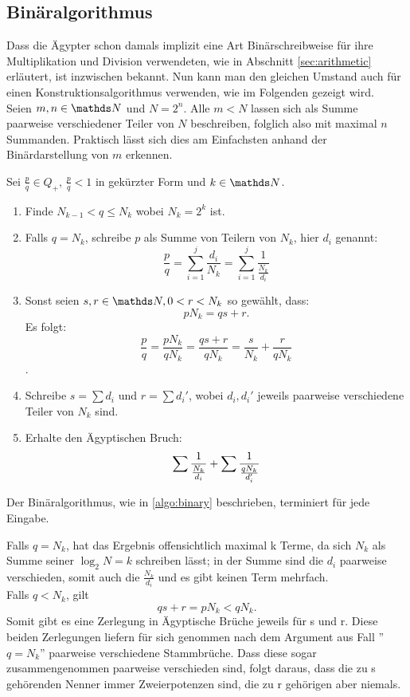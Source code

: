 \subsection{Binäralgorithmus}

Dass die Ägypter schon damals implizit eine Art Binärschreibweise für ihre Multiplikation und Division verwendeten, wie in Abschnitt \ref{sec:arithmetic} erläutert, ist inzwischen bekannt. Nun kann man den gleichen Umstand auch für einen Konstruktionsalgorithmus verwenden, wie im Folgenden gezeigt wird.\\
Seien $m, n \in \N$ und $N = 2^n$. Alle $m < N$ lassen sich als Summe paarweise verschiedener Teiler von $N$ beschreiben, folglich also mit maximal $n$ Summanden. Praktisch lässt sich dies am Einfachsten anhand der Binärdarstellung von $m$ erkennen.

\begin{algorithm}\label{algo:binary}
	Sei $\frac{p}{q} \in Q_+, \, \frac{p}{q} < 1$ in gekürzter Form und $k \in \N$.
	\begin{enumerate}
		\item Finde $N_{k-1} < q \leq N_k$ wobei $N_k=2^k$ ist.
		\item Falls $q = N_k$, schreibe $p$ als Summe von Teilern von $N_k$, hier $d_i$ genannt:
		$$\frac{p}{q} = \sum_{i=1}^{j} \frac{d_i}{N_k}=  \sum_{i = 1}^{j}\frac{1}{\frac{N_k}{d_i}}$$
		\item Sonst seien $s, r \in \N, 0 < r < N_k$ so gewählt, dass:
		$$pN_k = qs+r.$$
		Es folgt:
		$$\frac{p}{q} = \frac{p N_k}{q N_k} = \frac{qs + r}{q N_k} = \frac{s}{N_k} + \frac{r}{q N_k}$$.
		\item Schreibe $s = \sum d_i$ und $r = \sum d_i'$, wobei $d_i, d_i'$ jeweils paarweise verschiedene Teiler von $N_k$ sind.
		\item Erhalte den Ägyptischen Bruch:
		$$\sum \frac{1}{\frac{N_k}{d_i}} + \sum \frac{1}{\frac{q N_k}{d_i'}}$$
	\end{enumerate}
\end{algorithm}

\begin{satz}
	Der Binäralgorithmus, wie in \ref{algo:binary} beschrieben, terminiert für jede Eingabe.
\end{satz}

\begin{bew}
	Falls $q = N_k$, hat das Ergebnis offensichtlich maximal k Terme, da sich $N_k$ als Summe seiner $\log_2 N = k$ schreiben lässt; in der Summe sind die $d_i$ paarweise verschieden, somit auch die $\frac{N_k}{d_i}$ und es gibt keinen Term mehrfach.\\
	Falls $q < N_k$, gilt
	$$qs+r = p N_k < q N_k.$$
	Somit gibt es eine Zerlegung in Ägyptische Brüche jeweils für s und r. Diese beiden Zerlegungen liefern für sich genommen nach dem Argument aus Fall ''$q = N_k$'' paarweise verschiedene Stammbrüche. Dass diese sogar zusammengenommen paarweise verschieden sind, folgt daraus, dass die zu s gehörenden Nenner immer Zweierpotenzen sind, die zu r gehörigen aber niemals.
\end{bew}


